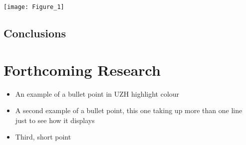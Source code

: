 \documentclass[a0,portrait]{a0poster}
\begin{document}
\begin{multicols}{3}
\begin{center}\vspace{1cm}
    \texttt{[image: Figure\_1]}
\end{center}\vspace{1cm}


\vspace{2cm}
\begin{tcolorbox}[width=0.95\linewidth,colback={conclusion},frame empty,boxsep=1cm]
\section{Conclusions}
\blindtext
\end{tcolorbox}    


\section{Forthcoming Research}

\blindtext
\color{uzhockerrot100}
\begin{itemize}
 \item An example of a bullet point in UZH highlight colour
 \item A second example of a bullet point, this one taking up more than one line just to see how it displays
 \item Third, short point
\end{itemize}
\color{Black}

\singlespacing
\small
\nocite{*} %


\end{multicols}
\end{document}
